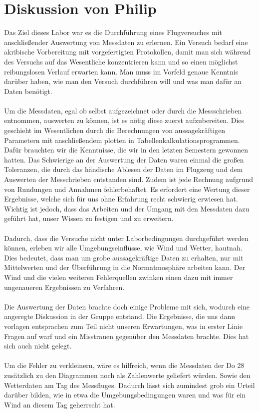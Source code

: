 \section{Diskussion von Philip}
Das Ziel dieses Labor war es die Durchführung eines Flugversuches mit anschließender Auswertung von Messdaten zu erlernen. Ein Versuch bedarf eine akribische Vorbereitung mit vorgefertigten Protokollen, damit man sich während des Versuchs auf das Wesentliche konzentrieren kann und so einen möglichst reibungslosen Verlauf erwarten kann. Man muss im Vorfeld genaue Kenntnis darüber haben, wie man den Versuch durchführen will und was man dafür an Daten benötigt. \\\\
Um die Messdaten, egal ob selbst aufgezeichnet oder durch die Messschrieben entnommen, auswerten zu können, ist es nötig diese zuerst aufzubereiten. Dies geschieht im Wesentlichen durch die Berechnungen von aussagekräftigen Parametern mit anschließendem plotten in Tabellenkalkulationsprogrammen. Dafür brauchten wir die Kenntnisse, die wir in den letzten Semestern gewonnen hatten. Das Schwierige an der Auswertung der Daten waren einmal die großen Toleranzen, die durch das händische Ablesen der Daten im Flugzeug und dem Auswerten der Messchrieben entstanden sind. Zudem ist jede Rechnung aufgrund von Rundungen und Annahmen fehlerbehaftet. Es erfordert eine Wertung dieser Ergebnisse, welche sich für uns ohne Erfahrung recht schwierig erwiesen hat. Wichtig ist jedoch, dass das Arbeiten und der Umgang mit den Messdaten dazu geführt hat, unser Wissen zu festigen und zu erweitern.\\\\
Dadurch, dass die Versuche nicht unter Laborbedingungen durchgeführt werden können, erleben wir alle Umgebungseinflüsse, wie Wind und Wetter, hautnah. Dies bedeutet, dass man um grobe aussagekräftige Daten zu erhalten, nur mit Mittelwerten und der Überführung in die Normatmosphäre arbeiten kann. Der Wind und die vielen weiteren Fehlerquellen zwinken einen dazu mit immer ungenaueren Ergebnissen zu Verfahren. \\\\
Die Auswertung der Daten brachte doch einige Probleme mit sich, wodurch eine angeregte Diskussion in der Gruppe entstand. Die Ergebnisse, die uns dann vorlagen entsprachen zum Teil nicht unseren Erwartungen, was in erster Linie Fragen auf warf und ein Misstrauen gegenüber den Messdaten brachte. Dies hat sich auch nicht gelegt.
\\\\
Um die Fehler zu verkleinern, wäre es hilfreich, wenn die Messdaten der Do 28 zusätzlich zu den Diagrammen noch als Zahlenwerte geliefert würden. Sowie den Wetterdaten am Tag des Messfluges. Dadurch lässt sich zumindest grob ein Urteil darüber bilden, wie in etwa die Umgebungsbedingungen waren und was für ein Wind an diesem Tag geherrscht hat. 

